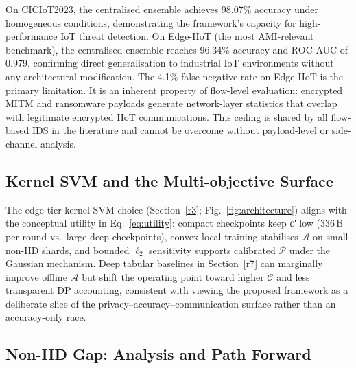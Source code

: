 \documentclass[sensors,article,submit,pdftex,moreauthors]{Definitions/mdpi}
\begin{document}
On CICIoT2023, the centralised ensemble achieves 98.07\% accuracy under homogeneous conditions, demonstrating the framework's capacity for high-performance IoT threat detection. On Edge-IIoT (the most AMI-relevant benchmark), the centralised ensemble reaches 96.34\% accuracy and ROC-AUC of 0.979, confirming direct generalisation to industrial IoT environments without any architectural modification. The 4.1\% false negative rate on Edge-IIoT is the primary limitation. It is an inherent property of flow-level evaluation: encrypted MITM and ransomware payloads generate network-layer statistics that overlap with legitimate encrypted IIoT communications. This ceiling is shared by all flow-based IDS in the literature and cannot be overcome without payload-level or side-channel analysis.

\subsection{Kernel SVM and the Multi-objective Surface}

The edge-tier kernel SVM choice (Section~\ref{r3}; Fig.~\ref{fig:architecture}) aligns with the conceptual utility in Eq.~\eqref{eq:utility}: compact checkpoints keep $\mathcal{C}$ low (336\,B per round vs.\ large deep checkpoints), convex local training stabilises $\mathcal{A}$ on small non-IID shards, and bounded $\ell_2$ sensitivity supports calibrated $\mathcal{P}$ under the Gaussian mechanism. Deep tabular baselines in Section~\ref{r7} can marginally improve offline $\mathcal{A}$ but shift the operating point toward higher $\mathcal{C}$ and less transparent DP accounting, consistent with viewing the proposed framework as a deliberate slice of the privacy--accuracy--communication surface rather than an accuracy-only race.

\subsection{Non-IID Gap: Analysis and Path Forward}
\end{document}
